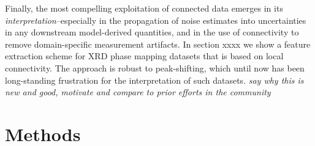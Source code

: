 \documentclass[12pt]{iopart}
\begin{document}
Finally, the most compelling exploitation of connected data emerges
in its \emph{interpretation}--especially in the propagation of noise
estimates into uncertainties in any downstream model-derived quantities,
and in the use of connectivity to remove domain-specific measurement
artifacts. In section xxxx we show a feature extraction scheme for XRD
phase mapping datasets that is based on local connectivity. The approach
is robust to peak-shifting, which until now has been long-standing
frustration for the interpretation of such datasets.
\emph{say why this is new and good, motivate and compare to prior efforts in the community}


%
%
%
%
%


\section{Methods}
\end{document}
